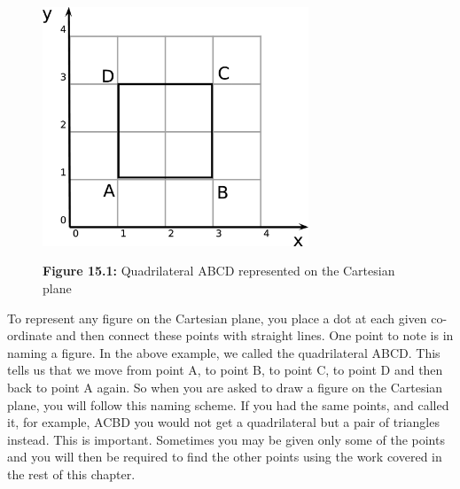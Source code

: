 	\begin{figure}[H] %
    \begin{center}
    \label{m39107*id63458!!!underscore!!!media}\label{m39107*id63458!!!underscore!!!printimage}\includegraphics[width=300px]{col11306.imgs/m39107_square.png} %
        
      \vspace{2pt}
    \vspace{\rubberspace}\par \begin{cnxcaption}
	  \small \textbf{Figure 15.1: }Quadrilateral ABCD represented on the Cartesian plane
	\end{cnxcaption}
      
    \vspace{.1in}
    
    \end{center}

 \end{figure}   

    \addtocounter{footnote}{-0}
    
\par \label{m39107*eip-645}To represent any figure on the Cartesian plane, you place a dot at each given co-ordinate and then connect these points with straight lines. One point to note is in naming a figure. In the above example, we called the quadrilateral ABCD. This tells us that we move from point A, to point B, to point C, to point D and then back to point A again. So when you are asked to draw a figure on the Cartesian plane, you will follow this naming scheme. If you had the same points, and called it, for example, ACBD you would not get a quadrilateral but a pair of triangles instead. This is important. Sometimes you may be given only some of the points and you will then be required to find the other points using the work covered in the rest of this chapter. \par \label{m39107*uid37}
